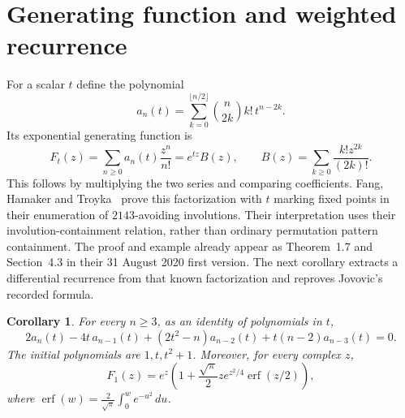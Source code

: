 \documentclass[11pt]{article}
\newtheorem{corollary}[theorem]{Corollary}
\begin{document}
\section{Generating function and weighted recurrence}
For a scalar $t$ define the polynomial
\begin{equation}\label{eq:polynomial}
 a_n(t)=\sum_{k=0}^{\lfloor n/2\rfloor}\binom n{2k}k!\,t^{n-2k}.
\end{equation}
Its exponential generating function is
\begin{equation}\label{eq:egf}
 F_t(z)=\sum_{n\geq0}a_n(t)\frac{z^n}{n!}
 =e^{tz}B(z),\qquad
 B(z)=\sum_{k\geq0}\frac{k!z^{2k}}{(2k)!}.
\end{equation}
This follows by multiplying the two series and comparing coefficients.
Fang, Hamaker and Troyka~\cite[Proposition 4.13 and its following example,
arXiv v3, p.~16]{fang} prove this factorization with $t$ marking fixed points in
their enumeration of $2143$-avoiding involutions. Their interpretation uses
their involution-containment relation, rather than ordinary permutation
pattern containment. The proof and example already appear as
Theorem~1.7 and Section~4.3 in their 31 August 2020 first version.
The next corollary extracts a differential recurrence from that known
factorization and reproves Jovovic's recorded formula.

\begin{corollary}\label{cor:weighted}
For every $n\geq3$, as an identity of polynomials in $t$,
\begin{equation}\label{eq:weightedrec}
 2a_n(t)-4t\,a_{n-1}(t)+(2t^2-n)a_{n-2}(t)
       +t(n-2)a_{n-3}(t)=0.
\end{equation}
The initial polynomials are $1,t,t^2+1$.
Moreover, for every complex $z$,
\begin{equation}\label{eq:erf}
 F_1(z)=e^z\left(1+\frac{\sqrt\pi}{2}z e^{z^2/4}
                                  \operatorname{erf}(z/2)\right),
\end{equation}
where $\operatorname{erf}(w)=\frac{2}{\sqrt\pi}\int_0^w e^{-u^2}\,du$.
\end{corollary}
\end{document}
